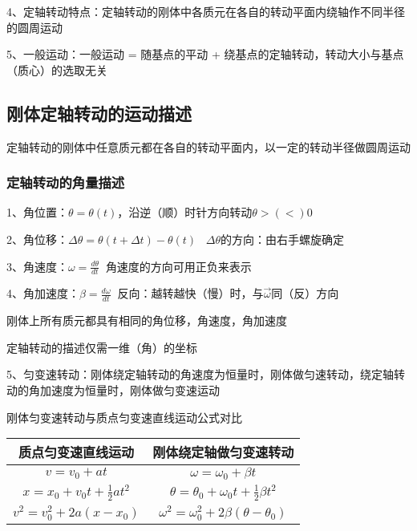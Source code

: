 \documentclass[UTF8]{article}
\begin{document}
    4、定轴转动特点：定轴转动的刚体中各质元在各自的转动平面内绕轴作不同半径的圆周运动

    5、一般运动：一般运动 = 随基点的平动 + 绕基点的定轴转动，转动大小与基点（质心）的选取无关

\subsection{刚体定轴转动的运动描述}

    定轴转动的刚体中任意质元都在各自的转动平面内，以一定的转动半径做圆周运动

\subsubsection{定轴转动的角量描述}

    1、角位置：$\theta = \theta (t)$，沿逆（顺）时针方向转动\;\;\;$\theta >(<) 0$

    2、角位移：$\Delta\theta = \theta(t + \Delta t) - \theta(t)\;\;\;\Delta\theta$的方向：由右手螺旋确定

    3、角速度：$\omega = \frac{d\theta}{dt}\;\;$角速度的方向可用正负来表示

    4、角加速度：$\beta = \frac{d\omega}{dt}\;\;$反向：越转越快（慢）时，与$\vec{\omega}$同（反）方向

    刚体上所有质元都具有相同的角位移，角速度，角加速度

    定轴转动的描述仅需一维（角）的坐标

    5、匀变速转动：刚体绕定轴转动的角速度为恒量时，刚体做匀速转动，绕定轴转动的角加速度为恒量时，刚体做匀变速运动

    刚体匀变速转动与质点匀变速直线运动公式对比

    \begin{tabular}{|c|c|}%
        \hline  %
        质点匀变速直线运动&刚体绕定轴做匀变速转动\\
        \hline  %
        $v = v_0 + at$&$\omega = \omega_0 + \beta t$\\
        \hline %
        $x = x_0 + v_0t + \frac{1}{2}at^2$&$\theta = \theta_0 + \omega_0t + \frac{1}{2}\beta t^2$\\
        \hline %
        $v^2 = v_0^2 + 2a(x - x_0)$&$\omega^2 = \omega_0^2 + 2\beta(\theta - \theta_0)$\\
        \hline %
    \end{tabular}
\end{document}
